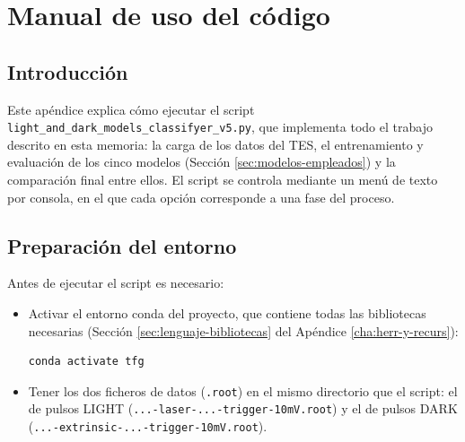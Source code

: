 %
%
%
%
%
%

\chapter{Manual de uso del código}
\label{cha:manual-de-usuario}

\section{Introducción}
\label{sec:intro-manual-de-usuario}

Este apéndice explica cómo ejecutar el script \texttt{light\_and\_dark\_models\_classifyer\_v5.py}, que implementa todo el trabajo descrito en esta memoria: la carga de los datos del TES, el entrenamiento y evaluación de los cinco modelos (Sección \ref{sec:modelos-empleados}) y la comparación final entre ellos. El script se controla mediante un menú de texto por consola, en el que cada opción corresponde a una fase del proceso.

\section{Preparación del entorno}
\label{sec:preparacion-entorno}

Antes de ejecutar el script es necesario:

\begin{itemize}
	\item Activar el entorno conda del proyecto, que contiene todas las bibliotecas necesarias (Sección \ref{sec:lenguaje-bibliotecas} del Apéndice \ref{cha:herr-y-recurs}):
	      \begin{lstlisting}[style=BashInputStyle, numbers=none]
conda activate tfg
	      \end{lstlisting}
	\item Tener los dos ficheros de datos (\texttt{.root}) en el mismo directorio que el script: el de pulsos LIGHT (\texttt{...-laser-...-trigger-10mV.root}) y el de pulsos DARK (\texttt{...-extrinsic-...-trigger-10mV.root}).
\end{itemize}

